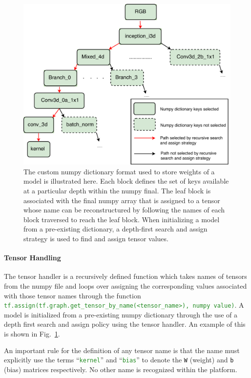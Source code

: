 \documentclass{llncs}
\begin{document}
\begin{figure}[t!]
\centering
\includegraphics[width=0.7\columnwidth]{images/checkpoint_recursive.pdf}
\caption{The custom numpy dictionary format used to store weights of a model is illustrated here. Each block defines the set of keys available at a particular depth within the numpy final. The leaf block is associated with the final numpy array that is assigned to a tensor whose name can be reconstructured by following the names of each block traversed to reach the leaf block. When initializing a model from a pre-existing dictionary, a depth-first search and assign strategy is used to find and assign tensor values.}
\label{fig:checkpoint_recursive}
\end{figure}
\paragraph{Tensor Handling}
The tensor handler is a recursively defined function which takes names of tensors from the numpy file and loops over assigning the corresponding values associated with those tensor names through the function \texttt{\textcolor{ForestGreen}{tf.assign(tf.graph.get\_tensor\_by\_name(\textless tensor\_name\textgreater), numpy value)}}.
A model is initialized from a pre-existing numpy dictionary through the use of a depth first search and assign policy using the tensor handler.
An example of this is shown in Fig.~\ref{fig:checkpoint_recursive}.

An important rule for the definition of any tensor name is that the name must explicitly use the terms ``\texttt{\textcolor{ForestGreen}{kernel}}'' and ``\texttt{\textcolor{ForestGreen}{bias}}'' to denote the \texttt{W} (weight) and \texttt{b} (bias) matrices respectively.
No other name is recognized within the platform.
\end{document}
